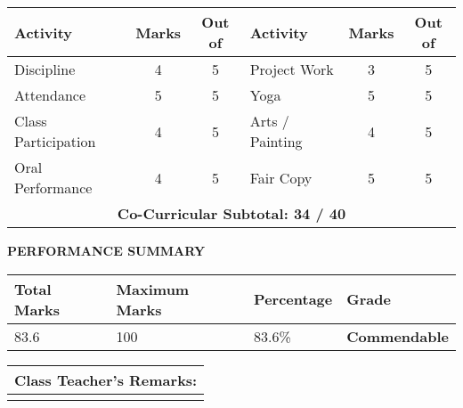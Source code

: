\documentclass[a4paper,11pt]{article}
\newcommand{\subheader}[1]{\textbf{\color{darkgreen}#1}}
\begin{document}
\begin{center}
\begin{tabularx}{\textwidth}{|X|c|c||X|c|c|}
\hline
\rowcolor{darkgreen!20}
\textbf{\color{white}Activity} & \textbf{\color{white}Marks} & \textbf{\color{white}Out of} & \textbf{\color{white}Activity} & \textbf{\color{white}Marks} & \textbf{\color{white}Out of} \\
\hline
Discipline & 4 & 5 & Project Work & 3 & 5 \\
\hline
Attendance & 5 & 5 & Yoga & 5 & 5 \\
\hline
Class Participation & 4 & 5 & Arts / Painting & 4 & 5 \\
\hline
Oral Performance & 4 & 5 & Fair Copy & 5 & 5 \\
\hline
\multicolumn{6}{|c|}{\cellcolor{saffron!20}\textbf{Co-Curricular Subtotal: 34 / 40}} \\
\hline
\end{tabularx}
\end{center}

\vspace{0.3cm}

\begin{center}
\colorbox{navy!10}{\parbox{0.9\textwidth}{
\vspace{0.2cm}
\begin{center}
\subheader{PERFORMANCE SUMMARY}
\end{center}
\begin{center}
\begin{tabularx}{0.85\textwidth}{|X|X|X|X|}
\hline
\rowcolor{saffron!30}
\textbf{Total Marks} & \textbf{Maximum Marks} & \textbf{Percentage} & \textbf{Grade} \\
\hline
83.6 & 100 & 83.6\% & \textbf{Commendable} \\
\hline
\end{tabularx}
\end{center}
\vspace{0.2cm}
}}
\end{center}

\vspace{0.3cm}

\begin{center}
\begin{tabularx}{\textwidth}{|X|}
\hline
\rowcolor{lightgray}
\textbf{Class Teacher's Remarks:} \\
\hline
\rule{0pt}{2.5cm} \\
\hline
\end{tabularx}
\end{center}
\end{document}
